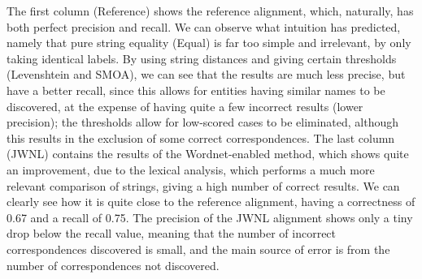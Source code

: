 The first column (Reference) shows the reference alignment, which, naturally, has both perfect precision and recall. We can observe what intuition has predicted, namely that pure string equality (Equal) is far too simple and irrelevant, by only taking identical labels. By using string distances and giving certain thresholds (Levenshtein and SMOA), we can see that the results are much less precise, but have a better recall, since this allows for entities having similar names to be discovered, at the expense of having quite a few incorrect results (lower precision); the thresholds allow for low-scored cases to be eliminated, although this results in the exclusion of some correct correspondences. The last column (JWNL) contains the results of the Wordnet-enabled method, which shows quite an improvement, due to the lexical analysis, which performs a much more relevant comparison of strings, giving a high number of correct results. We can clearly see how it is quite close to the reference alignment, having a correctness of 0.67 and a recall of 0.75. The precision of the JWNL alignment shows only a tiny drop below the recall value, meaning that the number of incorrect correspondences discovered is small, and the main source of error is from the number of correspondences not discovered.


% 


